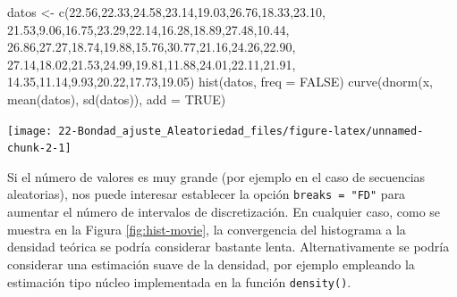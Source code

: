 \documentclass[
  10pt,
]{book}
\newenvironment{Shaded}{\begin{snugshade}}{\end{snugshade}}
\newcommand{\AttributeTok}[1]{\textcolor[rgb]{0.77,0.63,0.00}{#1}}
\newcommand{\ConstantTok}[1]{\textcolor[rgb]{0.00,0.00,0.00}{#1}}
\newcommand{\FloatTok}[1]{\textcolor[rgb]{0.00,0.00,0.81}{#1}}
\newcommand{\FunctionTok}[1]{\textcolor[rgb]{0.00,0.00,0.00}{#1}}
\newcommand{\NormalTok}[1]{#1}
\newcommand{\OtherTok}[1]{\textcolor[rgb]{0.56,0.35,0.01}{#1}}
\theoremstyle{break}
\theoremstyle{nonumberplain}
\begin{document}
\begin{Shaded}
\begin{Highlighting}[]
\NormalTok{datos }\OtherTok{\textless{}{-}} \FunctionTok{c}\NormalTok{(}\FloatTok{22.56}\NormalTok{,}\FloatTok{22.33}\NormalTok{,}\FloatTok{24.58}\NormalTok{,}\FloatTok{23.14}\NormalTok{,}\FloatTok{19.03}\NormalTok{,}\FloatTok{26.76}\NormalTok{,}\FloatTok{18.33}\NormalTok{,}\FloatTok{23.10}\NormalTok{,}
  \FloatTok{21.53}\NormalTok{,}\FloatTok{9.06}\NormalTok{,}\FloatTok{16.75}\NormalTok{,}\FloatTok{23.29}\NormalTok{,}\FloatTok{22.14}\NormalTok{,}\FloatTok{16.28}\NormalTok{,}\FloatTok{18.89}\NormalTok{,}\FloatTok{27.48}\NormalTok{,}\FloatTok{10.44}\NormalTok{,}
  \FloatTok{26.86}\NormalTok{,}\FloatTok{27.27}\NormalTok{,}\FloatTok{18.74}\NormalTok{,}\FloatTok{19.88}\NormalTok{,}\FloatTok{15.76}\NormalTok{,}\FloatTok{30.77}\NormalTok{,}\FloatTok{21.16}\NormalTok{,}\FloatTok{24.26}\NormalTok{,}\FloatTok{22.90}\NormalTok{,}
  \FloatTok{27.14}\NormalTok{,}\FloatTok{18.02}\NormalTok{,}\FloatTok{21.53}\NormalTok{,}\FloatTok{24.99}\NormalTok{,}\FloatTok{19.81}\NormalTok{,}\FloatTok{11.88}\NormalTok{,}\FloatTok{24.01}\NormalTok{,}\FloatTok{22.11}\NormalTok{,}\FloatTok{21.91}\NormalTok{,}
  \FloatTok{14.35}\NormalTok{,}\FloatTok{11.14}\NormalTok{,}\FloatTok{9.93}\NormalTok{,}\FloatTok{20.22}\NormalTok{,}\FloatTok{17.73}\NormalTok{,}\FloatTok{19.05}\NormalTok{)}
\FunctionTok{hist}\NormalTok{(datos, }\AttributeTok{freq =} \ConstantTok{FALSE}\NormalTok{)}
\FunctionTok{curve}\NormalTok{(}\FunctionTok{dnorm}\NormalTok{(x, }\FunctionTok{mean}\NormalTok{(datos), }\FunctionTok{sd}\NormalTok{(datos)), }\AttributeTok{add =} \ConstantTok{TRUE}\NormalTok{)}
\end{Highlighting}
\end{Shaded}

\begin{center}\texttt{[image: 22-Bondad\_ajuste\_Aleatoriedad\_files/figure-latex/unnamed-chunk-2-1]} \end{center}

Si el número de valores es muy grande (por ejemplo en el caso de secuencias aleatorias), nos puede interesar establecer la opción \texttt{breaks\ =\ "FD"} para aumentar el número de intervalos de discretización.
En cualquier caso, como se muestra en la Figura \ref{fig:hist-movie}, la convergencia del histograma a la densidad teórica se podría considerar bastante lenta.
Alternativamente se podría considerar una estimación suave de la densidad, por ejemplo empleando la estimación tipo núcleo implementada en la función \texttt{density()}.
\end{document}
